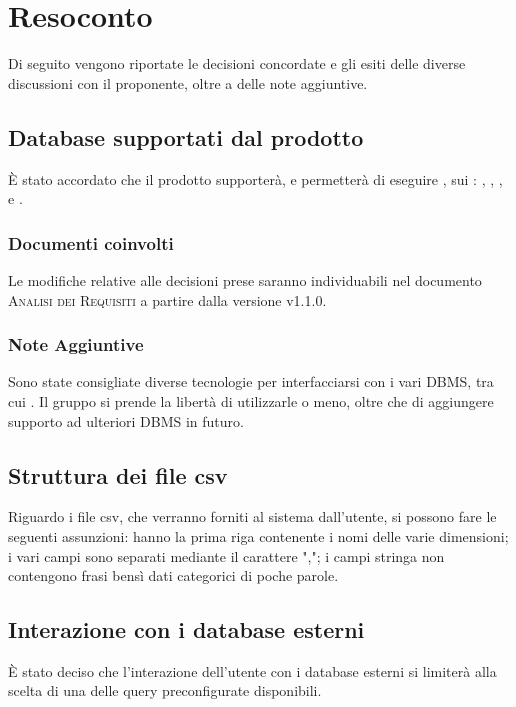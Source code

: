 \documentclass{article}
\begin{document}
\section{Resoconto}
\label{sec:resoconto}

Di seguito vengono riportate le decisioni concordate e gli esiti delle diverse discussioni con il proponente, oltre a
delle note aggiuntive.

\subsection{Database supportati dal prodotto}
\label{itm:1}

\`{E} stato accordato che il prodotto supporter\`{a}, e permetter\`{a} di eseguire , sui :
, ,  ,  e .

\subsubsection*{Documenti coinvolti}
Le modifiche relative alle decisioni prese saranno individuabili nel documento \textsc{Analisi dei Requisiti} a partire
dalla versione v1.1.0.

\subsubsection*{Note Aggiuntive}
Sono state consigliate diverse tecnologie per interfacciarsi con i vari DBMS, tra cui . Il gruppo
si prende la libert\`{a} di utilizzarle o meno, oltre che di aggiungere supporto ad ulteriori DBMS in futuro.

\subsection{Struttura dei file csv}
\label{itm:2}

Riguardo i file csv, che verranno forniti al sistema dall'utente, si possono fare le seguenti assunzioni: hanno la prima
riga contenente i nomi delle varie dimensioni; i vari campi sono separati mediante il carattere ","; i campi stringa non
contengono frasi bens\`{i} dati categorici di poche parole.

\subsection{Interazione con i database esterni}
\label{itm:3}
\`{E} stato deciso che l'interazione dell'utente con i database esterni si limiter\`{a} alla scelta di una delle query
preconfigurate disponibili.
\end{document}
